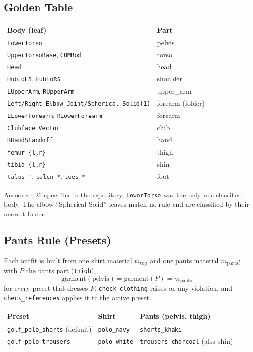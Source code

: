 \subsection{Golden Table}
\begin{tabular}{ll}
  Body (leaf) & Part \\ \hline
  \texttt{LowerTorso} & pelvis \\
  \texttt{UpperTorsoBase}, \texttt{COMRod} & torso \\
  \texttt{Head} & head \\
  \texttt{HubtoLS}, \texttt{HubtoRS} & shoulder \\
  \texttt{LUpperArm}, \texttt{RUpperArm} & upper\_arm \\
  \texttt{Left/Right Elbow Joint/Spherical Solid(1)} & forearm (folder) \\
  \texttt{LLowerForearm}, \texttt{RLowerForearm} & forearm \\
  \texttt{Clubface Vector} & club \\
  \texttt{RHandStandoff} & hand \\
  \texttt{femur\_\{l,r\}} & thigh \\
  \texttt{tibia\_\{l,r\}} & shin \\
  \texttt{talus\_*}, \texttt{calcn\_*}, \texttt{toes\_*} & foot \\
\end{tabular}

Across all 26 spec files in the repository, \texttt{LowerTorso} was the only
mis-classified body. The elbow ``Spherical Solid'' leaves match no rule and are
classified by their nearest folder.

\subsection{Pants Rule (Presets)}
Each outfit is built from one shirt material $m_{\mathrm{top}}$ and one pants
material $m_{\mathrm{pants}}$; with $P$ the pants part (\texttt{thigh}),
\[
  \mathrm{garment}(\text{pelvis}) = \mathrm{garment}(P) = m_{\mathrm{pants}}
\]
for every preset that dresses $P$. \texttt{check\_clothing} raises on any
violation, and \texttt{check\_references} applies it to the active preset.
\begin{tabular}{lll}
  Preset & Shirt & Pants (pelvis, thigh) \\ \hline
  \texttt{golf\_polo\_shorts} (default) & \texttt{polo\_navy} & \texttt{shorts\_khaki} \\
  \texttt{golf\_polo\_trousers} & \texttt{polo\_white} & \texttt{trousers\_charcoal} (also shin) \\
\end{tabular}

